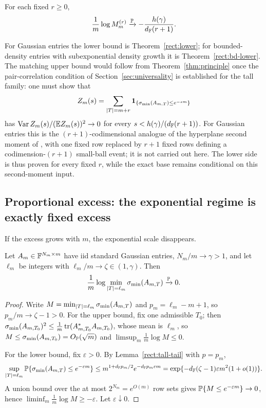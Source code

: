 \begin{conjecture}\label{rect:exact}
For each fixed \(r\ge0\),
\[
  \frac1m\log M_m^{(r)}\xrightarrow{\mathbb{P}}-\frac{h(\gamma)}{d_{\mathbb{F}}(r+1)}.
\]
\end{conjecture}

For Gaussian entries the lower bound is Theorem~\ref{rect:lower}; for
bounded-density entries with subexponential density growth it is
Theorem~\ref{rect:bd-lower}.  The matching upper bound would
follow from Theorem~\ref{thm:principle} once the pair-correlation condition of
Section~\ref{sec:universality} is established for the tall family: one must show
that
\[
  Z_m(s)=\sum_{|T|=m+r}\mathbf{1}_{\{\sigma_{\min}(A_{m,T})\le e^{-sm}\}}
\]
has \(\operatorname{Var} Z_m(s)/(\mathbb{E} Z_m(s))^2\to0\) for every \(s<h(\gamma)/(d_{\mathbb{F}}(r+1))\).
For Gaussian entries this is the \((r+1)\)-codimensional analogue of the
hyperplane second moment of \cite{ShmaloExtremal2026}, with one fixed row
replaced by \(r+1\) fixed rows defining a codimension-\((r+1)\) small-ball event;
it is not carried out here.  The lower side is thus proven for every fixed
\(r\), while the exact base remains conditional on this second-moment input.

\subsection{Proportional excess: the exponential regime is exactly fixed excess}

If the excess grows with \(m\), the exponential scale disappears.

\begin{proposition}\label{rect:proportional}
Let \(A_m\in\mathbb{F}^{N_m\times m}\) have iid standard Gaussian entries,
\(N_m/m\to\gamma>1\), and let \(\ell_m\) be integers with
\(\ell_m/m\to\zeta\in(1,\gamma)\).  Then
\[
  \frac1m\log\min_{|T|=\ell_m}\sigma_{\min}(A_{m,T})\xrightarrow{\mathbb{P}}0.
\]
\end{proposition}

\begin{proof}
Write \(M=\min_{|T|=\ell_m}\sigma_{\min}(A_{m,T})\) and \(p_m=\ell_m-m+1\), so
\(p_m/m\to\zeta-1>0\).  For the upper bound, fix one admissible \(T_0\); then
\(\sigma_{\min}(A_{m,T_0})^2\le\frac1m\operatorname{tr}(A_{m,T_0}^*A_{m,T_0})\), whose mean is
\(\ell_m\), so \(M\le\sigma_{\min}(A_{m,T_0})=O_{\mathbb{P}}(\sqrt m)\) and
\(\limsup_m\frac1m\log M\le0\).

For the lower bound, fix \(\varepsilon>0\).  By Lemma~\ref{rect:tall-tail} with
\(p=p_m\),
\[
  \sup_{|T|=\ell_m}\mathbb{P}\{\sigma_{\min}(A_{m,T})\le e^{-\varepsilon m}\}
  \le m^{1+d_{\mathbb{F}} p_m/2}e^{-d_{\mathbb{F}} p_m\varepsilon m}
  =\exp\{-d_{\mathbb{F}}(\zeta-1)\varepsilon m^2(1+o(1))\}.
\]
A union bound over the at most \(2^{N_m}=e^{O(m)}\) row sets gives
\(\mathbb{P}\{M\le e^{-\varepsilon m}\}\to0\), hence
\(\liminf_m\frac1m\log M\ge-\varepsilon\).  Let \(\varepsilon\downarrow0\).
\end{proof}

